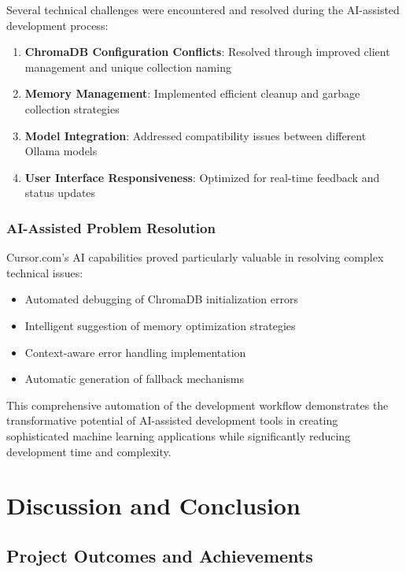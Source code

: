 Several technical challenges were encountered and resolved during the AI-assisted development process:

\begin{enumerate}
    \item \textbf{ChromaDB Configuration Conflicts}: Resolved through improved client management and unique collection naming
    \item \textbf{Memory Management}: Implemented efficient cleanup and garbage collection strategies
    \item \textbf{Model Integration}: Addressed compatibility issues between different Ollama models
    \item \textbf{User Interface Responsiveness}: Optimized for real-time feedback and status updates
\end{enumerate}

\subsubsection{AI-Assisted Problem Resolution}

Cursor.com's AI capabilities proved particularly valuable in resolving complex technical issues:

\begin{itemize}
    \item Automated debugging of ChromaDB initialization errors
    \item Intelligent suggestion of memory optimization strategies
    \item Context-aware error handling implementation
    \item Automatic generation of fallback mechanisms
\end{itemize}

This comprehensive automation of the development workflow demonstrates the transformative potential of AI-assisted development tools in creating sophisticated machine learning applications while significantly reducing development time and complexity.

\newpage

\section{Discussion and Conclusion}

\subsection{Project Outcomes and Achievements}

